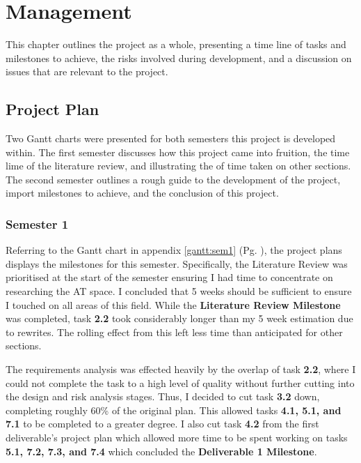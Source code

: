 %
\chapter{Management}
\label{sec:management}

This chapter outlines the project as a whole, presenting a time line of tasks and milestones to achieve, the risks involved during development, and a discussion on issues that are relevant to the project.



\section{Project Plan}
\label{sec:management:pp}

\noindent Two Gantt charts were presented for both semesters this project is developed within. The first semester discusses how this project came into fruition, the time lime of the literature review, and illustrating the of time taken on other sections. The second semester outlines a rough guide to the development of the project, import milestones to achieve, and the conclusion of this project.

\subsection{Semester 1}
\label{sec:management:pp:sem1}

\noindent Referring to the Gantt chart in appendix \ref{gantt:sem1} (Pg. \pageref{gantt:sem1}), the project plans displays the milestones for this semester. Specifically, the Literature Review was prioritised at the start of the semester ensuring I had time to concentrate on researching the AT space. I concluded that 5 weeks should be sufficient to ensure I touched on all areas of this field. While the \textbf{Literature Review Milestone} was completed, task \textbf{2.2} took considerably longer than my 5 week estimation due to rewrites. The rolling effect from this left less time than anticipated for other sections.

The requirements analysis was effected heavily by the overlap of task \textbf{2.2}, where I could not complete the task to a high level of quality without further cutting into the design and risk analysis stages. Thus, I decided to cut task \textbf{3.2} down, completing roughly 60\% of the original plan. This allowed tasks \textbf{4.1, 5.1, and 7.1} to be completed to a greater degree. I also cut task \textbf{4.2} from the first deliverable's project plan which allowed more time to be spent working on tasks \textbf{5.1, 7.2, 7.3, and 7.4} which concluded the \textbf{Deliverable 1 Milestone}. 



